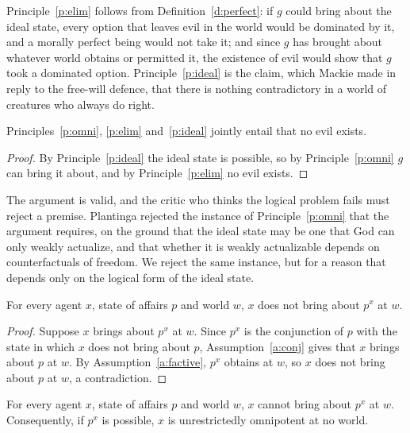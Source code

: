 \documentclass{situationist-preprint}
\begin{document}
Principle~\ref{p:elim} follows from Definition~\ref{d:perfect}: if $g$ could bring about the ideal state, every option that leaves evil in the world would be dominated by it, and a morally perfect being would not take it; and since $g$ has brought about whatever world obtains or permitted it, the existence of evil would show that $g$ took a dominated option. Principle~\ref{p:ideal} is the claim, which Mackie made in reply to the free-will defence, that there is nothing contradictory in a world of creatures who always do right.

\begin{proposition}[Validity]\label{p:valid}
Principles~\ref{p:omni}, \ref{p:elim} and~\ref{p:ideal} jointly entail that no evil exists.
\end{proposition}

\begin{proof}
By Principle~\ref{p:ideal} the ideal state is possible, so by Principle~\ref{p:omni} $g$ can bring it about, and by Principle~\ref{p:elim} no evil exists.
\end{proof}

The argument is valid, and the critic who thinks the logical problem fails must reject a premise. Plantinga rejected the instance of Principle~\ref{p:omni} that the argument requires, on the ground that the ideal state may be one that God can only weakly actualize, and that whether it is weakly actualizable depends on counterfactuals of freedom. We reject the same instance, but for a reason that depends only on the logical form of the ideal state.

\begin{lemma}\label{l:diag}
For every agent $x$, state of affairs $p$ and world $w$, $x$ does not bring about $p^{x}$ at $w$.
\end{lemma}

\begin{proof}
Suppose $x$ brings about $p^{x}$ at $w$. Since $p^{x}$ is the conjunction of $p$ with the state in which $x$ does not bring about $p$, Assumption~\ref{a:conj} gives that $x$ brings about $p$ at $w$. By Assumption~\ref{a:factive}, $p^{x}$ obtains at $w$, so $x$ does not bring about $p$ at $w$, a contradiction.
\end{proof}

\begin{theorem}\label{t:space}
For every agent $x$, state of affairs $p$ and world $w$, $x$ cannot bring about $p^{x}$ at $w$. Consequently, if $p^{x}$ is possible, $x$ is unrestrictedly omnipotent at no world.
\end{theorem}
\end{document}

